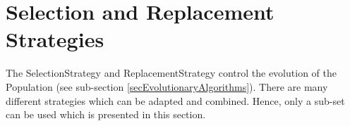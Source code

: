 %
%
%
%
\newpage
\section{Selection and Replacement Strategies}
\label{secSelectionReplacementStrategies}

The \gls{SelectionStrategy} and \gls{ReplacementStrategy} control the evolution of the \gls{Population} (see sub-section \ref{secEvolutionaryAlgorithms}). There are many different strategies which can be adapted and combined. Hence, only a sub-set can be used which is presented in this section.


